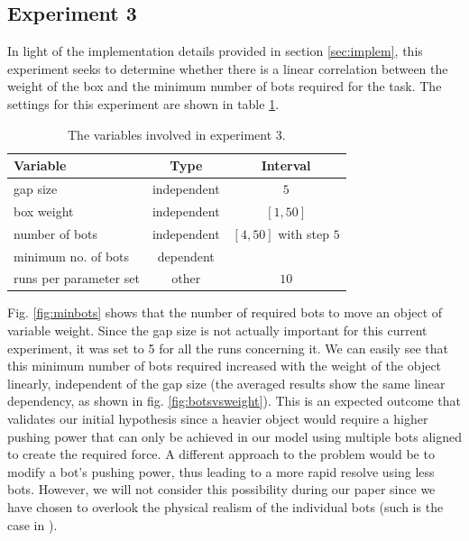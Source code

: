 \subsection{Experiment 3}
\label{ssec:exp3}

In light of the implementation details provided in section \ref{sec:implem}, this experiment seeks to determine whether there is a linear correlation between the weight of the box and the minimum number of bots required for the task. The settings for this experiment are shown in table \ref{tbl:exp3}.

\begin{table}
 \caption{The variables involved in experiment 3.}
 \begin{center}
  \begin{tabular}{| p{5cm} | c | c |}
   \hline
   \centering \textbf{Variable} & \textbf{Type} & \textbf{Interval} \\ \hline
   gap size & independent & $5$ \\ \hline
   box weight & independent & $[1, 50]$ \\ \hline
   number of bots & independent & $[4, 50]$ with step $5$ \\ \hline
   minimum no. of bots & dependent &  \\ \hline
   runs per parameter set & other & $10$ \\ \hline
  \end{tabular}
 \end{center}
 \label{tbl:exp3}
\end{table}

Fig. \ref{fig:minbots} shows that the number of required bots to move an object of variable weight. Since the gap size is not actually important for this current experiment, it was set to 5 for all the runs concerning it. We can easily see that this minimum number of bots required increased with the weight of the object linearly, independent of the gap size (the averaged results show the same linear dependency, as shown in fig. \ref{fig:botsvsweight}). This is an expected outcome that validates our initial hypothesis since a heavier object would require a higher pushing power that can only be achieved in our model using multiple bots aligned to create the required force. A different approach to the problem would be to modify a bot's pushing power, thus leading to a more rapid resolve using less bots. However, we will not consider this possibility during our paper since we have chosen to overlook the physical realism of the individual bots (such is the case in \cite{Yun:2011:OSA:2036628.2036638}).

